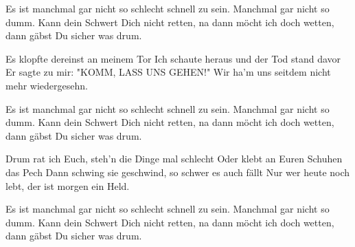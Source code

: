     \beginchorus\replay[chorus]
        Es ist manchmal gar nicht so schlecht schnell zu sein.
        Manchmal gar nicht so dumm.
        Kann dein Schwert Dich nicht retten,
        na dann möcht ich doch wetten, dann gäbst Du sicher was drum.
    \endchorus

    \beginverse\replay[verse]
        Es klopfte dereinst an meinem Tor
        Ich schaute heraus und der Tod stand davor
        Er sagte zu mir: "KOMM, LASS UNS GEHEN!"
        Wir ha'm uns seitdem nicht mehr wiedergesehn.
    \endverse

    \beginchorus\replay[chorus]
        Es ist manchmal gar nicht so schlecht schnell zu sein.
        Manchmal gar nicht so dumm.
        Kann dein Schwert Dich nicht retten,
        na dann möcht ich doch wetten, dann gäbst Du sicher was drum.
    \endchorus

    \beginverse\replay[verse]
        Drum rat ich Euch, steh'n die Dinge mal schlecht
        Oder klebt an Euren Schuhen das Pech
        Dann schwing sie geschwind, so schwer es auch fällt
        Nur wer heute noch lebt, der ist morgen ein Held.
    \endverse

    \beginchorus\replay[chorus]
        Es ist manchmal gar nicht so schlecht schnell zu sein.
        Manchmal gar nicht so dumm.
        Kann dein Schwert Dich nicht retten,
        na dann möcht ich doch wetten, dann gäbst Du sicher was drum.
    \endchorus
\endsong
